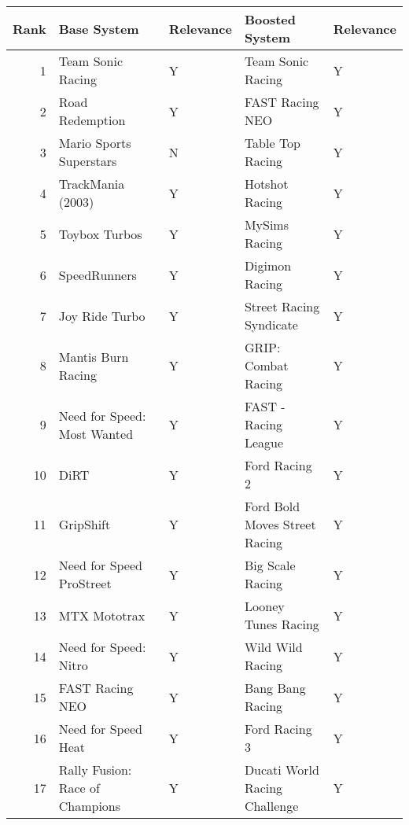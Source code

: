 \begin{tabular}{rllll}
\toprule
 Rank &                        Base System & Relevance &                     Boosted System & Relevance \\
\midrule
    1 &                  Team Sonic Racing &         Y &                  Team Sonic Racing &         Y \\
    2 &                    Road Redemption &         Y &                    FAST Racing NEO &         Y \\
    3 &            Mario Sports Superstars &         N &                   Table Top Racing &         Y \\
    4 &                  TrackMania (2003) &         Y &                     Hotshot Racing &         Y \\
    5 &                      Toybox Turbos &         Y &                      MySims Racing &         Y \\
    6 &                       SpeedRunners &         Y &                     Digimon Racing &         Y \\
    7 &                     Joy Ride Turbo &         Y &            Street Racing Syndicate &         Y \\
    8 &                 Mantis Burn Racing &         Y &                GRIP: Combat Racing &         Y \\
    9 &        Need for Speed: Most Wanted &         Y &               FAST - Racing League &         Y \\
   10 &                               DiRT &         Y &                      Ford Racing 2 &         Y \\
   11 &                          GripShift &         Y &      Ford Bold Moves Street Racing &         Y \\
   12 &           Need for Speed ProStreet &         Y &                   Big Scale Racing &         Y \\
   13 &                       MTX Mototrax &         Y &                Looney Tunes Racing &         Y \\
   14 &              Need for Speed: Nitro &         Y &                   Wild Wild Racing &         Y \\
   15 &                    FAST Racing NEO &         Y &                   Bang Bang Racing &         Y \\
   16 &                Need for Speed Heat &         Y &                      Ford Racing 3 &         Y \\
   17 &    Rally Fusion: Race of Champions &         Y &      Ducati World Racing Challenge &         Y \\

\end{tabular}
